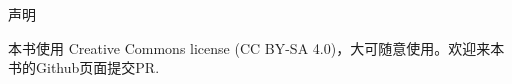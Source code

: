 \begin{center}
    {\Large 声明}
\end{center}

本书使用 Creative Commons license (CC BY-SA 4.0)，大可随意使用。欢迎来本书的Github页面提交PR.